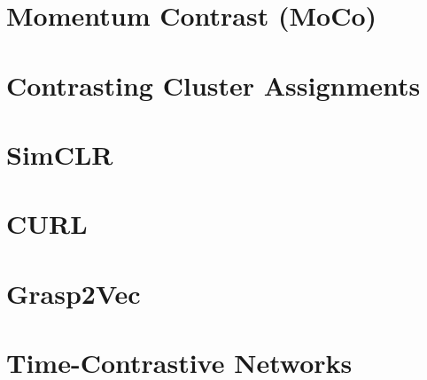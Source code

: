 \documentclass[../main.tex]{subfiles}
\begin{document}
\section{Momentum Contrast (MoCo)}

\section{Contrasting Cluster Assignments}

\section{SimCLR}

\section{CURL}

\section{Grasp2Vec}

\section{Time-Contrastive Networks}
\end{document}
